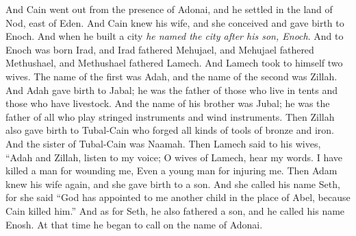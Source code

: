 \begin{biblechapter}
\verse And Cain went out from the presence of Adonai, and he settled in the land of Nod, east of Eden.
\verse And Cain knew his wife, and she conceived and gave birth to Enoch. And when he built a city \textit{he named the city after his son, Enoch}.
\verse And to Enoch was born Irad, and Irad fathered Mehujael, and Mehujael fathered Methushael, and Methushael fathered Lamech.
\verse And Lamech took to himself two wives. The name of the first was Adah, and the name of the second was Zillah.
\verse And Adah gave birth to Jabal; he was the father of those who live in tents and those who have livestock.
\verse And the name of his brother was Jubal; he was the father of all who play stringed instruments and wind instruments.
\verse Then Zillah also gave birth to Tubal-Cain who forged all kinds of tools of bronze and iron. And the sister of Tubal-Cain was Naamah.
\verse Then Lamech said to his wives,
\verse “Adah and Zillah, listen to my voice; 
O wives of Lamech, hear my words. 
I have killed a man for wounding me, 
Even a young man for injuring me.
\verse Then Adam knew his wife again, and she gave birth to a son. And she called his name Seth, for she said “God has appointed to me another child in the place of Abel, because Cain killed him.”
\verse And as for Seth, he also fathered a son, and he called his name Enosh. At that time he began to call on the name of Adonai.
\end{biblechapter}

